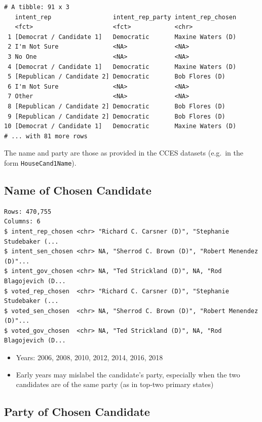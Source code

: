 \documentclass[10pt,article,oneside]{memoir}
\theoremstyle{definition}
\begin{document}
\begin{verbatim}
# A tibble: 91 x 3
   intent_rep                 intent_rep_party intent_rep_chosen
   <fct>                      <fct>            <chr>            
 1 [Democrat / Candidate 1]   Democratic       Maxine Waters (D)
 2 I'm Not Sure               <NA>             <NA>             
 3 No One                     <NA>             <NA>             
 4 [Democrat / Candidate 1]   Democratic       Maxine Waters (D)
 5 [Republican / Candidate 2] Democratic       Bob Flores (D)   
 6 I'm Not Sure               <NA>             <NA>             
 7 Other                      <NA>             <NA>             
 8 [Republican / Candidate 2] Democratic       Bob Flores (D)   
 9 [Republican / Candidate 2] Democratic       Bob Flores (D)   
10 [Democrat / Candidate 1]   Democratic       Maxine Waters (D)
# ... with 81 more rows
\end{verbatim}

The name and party are those as provided in the CCES datasets (e.g.~in
the form \texttt{HouseCand1Name}).

\hypertarget{name-of-chosen-candidate}{%
\subsection{Name of Chosen Candidate}\label{name-of-chosen-candidate}}

\begin{verbatim}
Rows: 470,755
Columns: 6
$ intent_rep_chosen <chr> "Richard C. Carsner (D)", "Stephanie Studebaker (...
$ intent_sen_chosen <chr> NA, "Sherrod C. Brown (D)", "Robert Menendez (D)"...
$ intent_gov_chosen <chr> NA, "Ted Strickland (D)", NA, "Rod Blagojevich (D...
$ voted_rep_chosen  <chr> "Richard C. Carsner (D)", "Stephanie Studebaker (...
$ voted_sen_chosen  <chr> NA, "Sherrod C. Brown (D)", "Robert Menendez (D)"...
$ voted_gov_chosen  <chr> NA, "Ted Strickland (D)", NA, "Rod Blagojevich (D...
\end{verbatim}

\begin{itemize}
\tightlist
\item
  Years: 2006, 2008, 2010, 2012, 2014, 2016, 2018
\item
  Early years may mislabel the candidate's party, especially when the
  two candidates are of the same party (as in top-two primary states)
\end{itemize}

\hypertarget{party-of-chosen-candidate}{%
\subsection{Party of Chosen Candidate}\label{party-of-chosen-candidate}}
\end{document}
